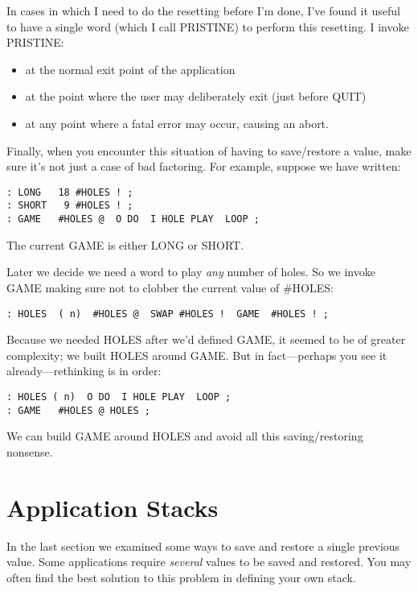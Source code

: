 In cases in which I need to do the resetting before I'm done, I've found it
useful to have a single word (which I call PRISTINE) to perform this
resetting. I invoke PRISTINE:

\begin{itemize}
\item at the normal exit point of the application
\item at the point where the user may deliberately exit (just before QUIT)
\item at any point where a fatal error may occur, causing an abort.
\end{itemize}

Finally, when you encounter this situation of having to save/restore a
value, make sure it's not just a case of bad factoring. For example,
suppose we have written:

\begin{verbatim}
: LONG   18 #HOLES ! ;
: SHORT   9 #HOLES ! ;
: GAME   #HOLES @  O DO  I HOLE PLAY  LOOP ;
\end{verbatim}

The current GAME is either LONG or SHORT.

Later we decide we need a word to play \emph{any} number of holes. So we
invoke GAME making sure not to clobber the current value of \#HOLES:

\begin{verbatim}
: HOLES  ( n)  #HOLES @  SWAP #HOLES !  GAME  #HOLES ! ;
\end{verbatim}

Because we needed HOLES after we'd defined GAME, it seemed to be of
greater complexity; we built HOLES around GAME. But in fact---perhaps
you see it already---rethinking is in order:

\begin{verbatim}
: HOLES ( n)  O DO  I HOLE PLAY  LOOP ;
: GAME   #HOLES @ HOLES ;
\end{verbatim}

We can build GAME around HOLES and avoid all this saving/restoring
nonsense.

\section{Application Stacks}

In the last section we examined some ways to save and restore a single
previous value. Some applications require \emph{several} values to be saved and
restored. You may often find the best solution to this problem in defining
your own stack.


